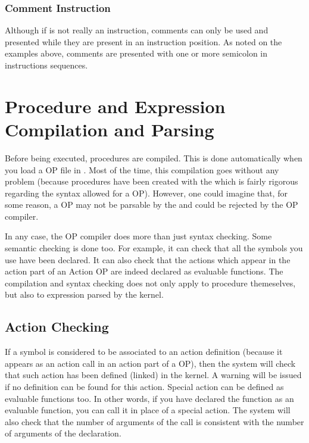 \subsubsection{Comment Instruction}

Although if is not really an instruction, comments can only be used and
presented while they are present in an instruction position. As noted on the
examples above, comments are presented with one or more semicolon \samp{;} in
instructions sequences.

\section{Procedure and Expression Compilation and Parsing}

Before being executed, procedures are compiled. This is done
automatically when you load a OP file in \aCPK{}. Most of the time, this
compilation goes without any problem (because procedures have been
created with the \OPE{} which is fairly rigorous regarding the syntax
allowed for a OP). However, one could imagine that, for some reason, a OP
may not be parsable by the \CPK{} and could be rejected by the OP compiler.

In any case, the OP compiler does more than just syntax checking. Some
semantic checking is done too. For example, it can check that all the
symbols you use have been declared. It can also check that the actions
which appear in the action part of an Action OP are indeed declared as
evaluable functions. The compilation and syntax checking does not only apply to
procedure themeselves, but also to expression parsed by the kernel.



\subsection{Action Checking}

If a symbol is considered to be associated to an action definition
(because it appears as an action call in an action part of a OP), then
the system will check that such action has been defined (linked) in the
kernel. A warning will be issued if no definition can be found for this
action. Special action can be defined as evaluable functions too. In other
words, if you have declared the function  as an evaluable
function, you can call it in place of a special action. The system will also
check that the number of arguments of the call is consistent with the number of
arguments of the declaration.


